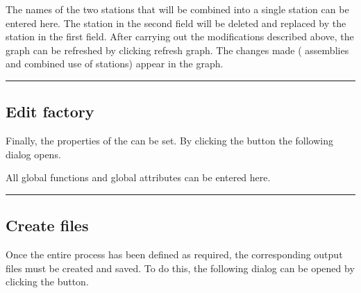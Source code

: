 \documentclass[letterpaper,10pt,english]{sphinxmanual}
\begin{document}

\sphinxAtStartPar
The names of the two stations that will be combined into a single station can be entered here. The station in the
second field will be deleted and replaced by the station in the first field. After carrying out the modifications
described above, the graph can be refreshed by clicking refresh graph. The changes made ( assemblies and combined use
of stations) appear in the graph.



\bigskip\hrule\bigskip



\subsection{Edit factory}
\label{\detokenize{source/Defining_processes/defining_processes:edit-factory}}\label{\detokenize{source/Defining_processes/defining_processes:dp-factory}}
\sphinxAtStartPar
Finally, the properties of the  can be set. By clicking the button  the following dialog opens.


\sphinxAtStartPar
All global functions and global attributes can be entered here.


\bigskip\hrule\bigskip



\subsection{Create files}
\label{\detokenize{source/Defining_processes/defining_processes:create-files}}\label{\detokenize{source/Defining_processes/defining_processes:dp-files}}
\sphinxAtStartPar
Once the entire process has been defined as required, the corresponding output files must be created and saved. To do
this, the following dialog can be opened by clicking the  button.
\end{document}
